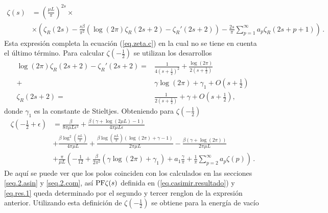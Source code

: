 \begin{align}
\zeta (s) &= \left( \frac{\mu L}{\pi} \right) ^{2s} \times \\
			\nonumber
			&\times
			\left(
					\zeta _R (2s) - \frac{s \beta}{\pi ^2} 
						\left(
							\log (2 \pi ) \zeta _R (2s+2) - \zeta _R '(2s+2)
							\right)-
					\frac{2 s}{\pi} \sum _{p=1} ^{\infty}
						a _p \zeta _R (2s+p+1)
					\right)
\, .					
\end{align}
Esta expresión completa la ecuación (\ref{eq.zeta.c}) en  la cual no se tiene en cuenta el último término.
Para calcular $\zeta \left( - \frac{1}{2} \right)$ se utilizan los desarrollos
\begin{align}\label{cortar}
	\log (2 \pi) \zeta _R (2s+2) -
	\zeta _R ' (2s+2) = & 
	\frac{1}{4 \left( s + \frac{1}{2} \right) ^2} + 
	\frac{ \log (2 \pi ) }{2 \left( s + \frac{1}{2} \right) } \\
	+ &  \gamma \log (2 \pi ) + \gamma _1 + O \left( s + \frac{1}{2} \right) \\
	\zeta _R (2s+2) = &\frac{1}{2 \left( s + \frac{1}{2} \right)} + \gamma + O \left( s + \frac{1}{2} \right)
	 ,
\end{align}
donde $\gamma _1$ es la constante de Stieltjes. Obteniendo para $\zeta \left( - \frac{1}{2} \right) $
\begin{align}\label{eq.zeta.final}
\zeta \left( - \frac{1}{2} + \epsilon \right) &=
		\frac{\beta}{8  \pi \mu L \epsilon ^2}	 +
	    \frac{
	    	\beta ( \gamma  +  \log (2 \mu L ) -1 ) }
	    	{4  \pi \mu L \epsilon } 
\\[5pt]
\nonumber
&
+
		\frac{\beta \log ^2 \left( \frac{\mu L}{\pi} \right)}{4 \pi \mu L}  +
		\frac{
			\beta \log \left( \frac{\mu L}{\pi}\right)
				( \log (2 \pi ) + \gamma -1)}
			{2 \pi \mu L}  
- \frac{\beta (\gamma + \log(2 \pi) )}{2 \pi \mu L}
\\[5pt]
\nonumber
&
+
\frac{\pi}{\mu L}  
					\left(
							- \frac{1}{12} +
							\frac{\beta}{2 \pi ^2} \left(
														\gamma \log (2 \pi)
														+ \gamma _1
														\right) +
								a _1 \frac{\gamma}{\pi} +
								\frac{1}{\pi} \sum _{p=2} ^{\infty}
								a_p \zeta (p) 
							\right) 
\, .
\end{align}
De aquí se puede ver que los polos coinciden con los calculados en las secciones \ref{seq.2.asin} y \ref{seq.2.com}, así ${\rm PF} \zeta (s)$ definida en (\ref{eq.casimir.resultado}) y \eqref{eq.res.1} queda determinado por el segundo y tercer renglon de la expresión anterior. 
Utilizando esta definición de $\zeta \left( - \frac{1}{2} \right) $ se obtiene para la energía de vacío
